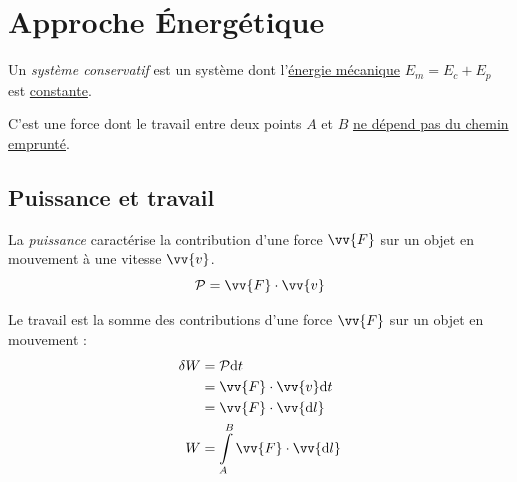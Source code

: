 \documentclass[11pt,a4paper,fleqn,pdftex]{report}
\begin{document}
\section{Approche Énergétique}
\begin{dfn}
Un \emph{système conservatif} est un système dont l'\uline{énergie mécanique} $E_m = E_c + E_p$ est \uline{constante}.
\end{dfn}
%
\begin{dfn}
C'est une force dont le travail entre deux points $A$ et $B$ \uline{ne dépend pas du chemin emprunté}.
\end{dfn}
%
\subsection{Puissance et travail}
\begin{dfn}
La \emph{puissance} caractérise la contribution d'une force $\vv{F}$ sur un objet en mouvement à une vitesse $\vv{v}$.
\begin{equation}
\mathcal{P} = \vv{F} \cdot \vv{v}
\end{equation}
\end{dfn}
%
\begin{dfn}
Le travail est la somme des contributions d'une force $\vv{F}$ sur un objet en mouvement : 
\begin{align}
\delta W &= \mathcal{P} \d t \\
         &= \vv{F} \cdot \vv{v} \d t \nonumber \\
         &= \vv{F} \cdot \vv{\d l} \nonumber \\
       W &= \int \limits_A^B \vv{F} \cdot \vv{\d l}
\end{align}
\end{dfn}
%
\end{document}
